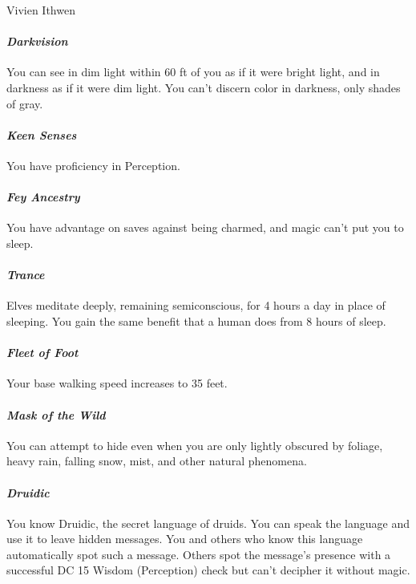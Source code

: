 \documentclass[10pt,twoside,twocolumn]{book}
\begin{document}
\begin{rpg-monsterbox}{Vivien Ithwen}
   \paragraph{\emph{Darkvision}}
   You can see in dim light within 60 ft of you as if it were bright light, and in darkness as if it were dim light.
   You can't discern color in darkness, only shades of gray.

   \paragraph{\emph{Keen Senses}}
   You have proficiency in Perception.

   \paragraph{\emph{Fey Ancestry}}
   You have advantage on saves against being charmed, and magic can't put you to sleep.
   
   \paragraph{\emph{Trance}}
   Elves meditate deeply, remaining semiconscious, for 4 hours a day in place of sleeping.
   You gain the same benefit that a human does from 8 hours of sleep.

   \paragraph{\emph{Fleet of Foot}}
   Your base walking speed increases to 35 feet.
   
   \paragraph{\emph{Mask of the Wild}}
   You can attempt to hide even when you are only lightly obscured by foliage, heavy rain, falling snow, mist, and other natural phenomena.
   \newline ~

   \paragraph{\emph{Druidic}}
   You know Druidic, the secret language of druids.
   You can speak the language and use it to leave hidden messages.
   You and others who know this language automatically spot such a message.
   Others spot the message's presence with a successful DC 15 Wisdom (Perception) check but can't decipher it without magic.


\end{rpg-monsterbox}
\end{document}
